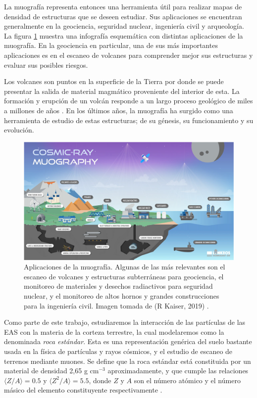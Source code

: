 \documentclass[12pt]{report}
\begin{document}
La muografía representa entonces una herramienta útil para realizar mapas de densidad de estructuras que se deseen estudiar. Sus aplicaciones se encuentran generalmente en la geociencia, seguridad nuclear, ingeniería civil y arqueología. La figura \ref{fig:applications} muestra una infografía esquemática con distintas aplicaciones de la muografía. En la geociencia en particular, una de sus más importantes aplicaciones es en el escaneo de volcanes para comprender mejor sus estructuras y evaluar sus posibles riesgos.

Los volcanes son puntos en la superficie de la Tierra por donde se puede presentar la salida de material magmático proveniente del interior de esta. La formación y erupción de un volcán responde a un largo proceso geológico de miles a millones de años \cite{vesga2018inversion}. En los últimos años, la muografía ha surgido como una herramienta de estudio de estas estructuras; de su génesis, su funcionamiento y su evolución.

\begin{figure}
    \centering
    \includegraphics[width=\textwidth]{images/applications.png}
    \caption{Aplicaciones de la muografía. Algunas de las más relevantes son el escaneo de volcanes y estructuras subterráneas para geociencia, el monitoreo de materiales y desechos radiactivos para seguridad nuclear, y el monitoreo de altos hornos y grandes construcciones para la ingeniería civil. Imagen tomada de (R Kaiser, 2019) \cite{kaiser2019muography}.}
    \label{fig:applications}
\end{figure}

Como parte de este trabajo, estudiaremos la interacción de las partículas de las EAS con la materia de la corteza terrestre, la cual modelaremos como la denominada \textit{roca estándar}. Esta es una representación genérica del suelo bastante usada en la física de partículas y rayos cósmicos, y el estudio de escaneo de terrenos mediante muones. Se define que la roca estándar está constituida por un material de densidad 2,65 g cm$^{-3}$ aproximadamente, y que cumple las relaciones $\langle Z/A \rangle=0.5$ y $\langle Z^2/A \rangle=5.5$, donde $Z$ y $A$ son el número atómico y el número másico del elemento constituyente respectivamente \cite{groom2001muon}.
\end{document}
